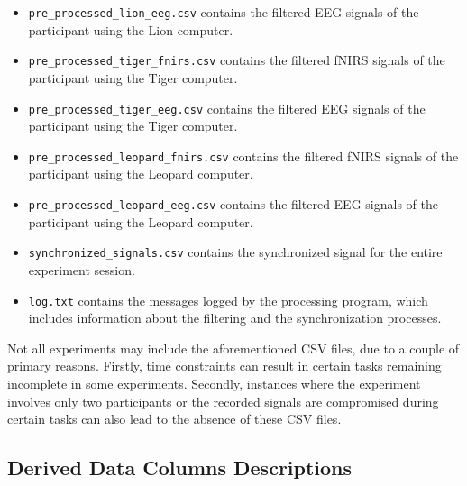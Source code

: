 \begin{itemize}
  \item \texttt{pre\_processed\_lion\_eeg.csv}  contains the filtered EEG signals of the participant using the Lion computer.
  \item \texttt{pre\_processed\_tiger\_fnirs.csv}  contains the filtered fNIRS signals of the participant using the Tiger computer.
  \item \texttt{pre\_processed\_tiger\_eeg.csv}  contains the filtered EEG signals of the participant using the Tiger computer.
  \item \texttt{pre\_processed\_leopard\_fnirs.csv}  contains the filtered fNIRS signals of the participant using the Leopard computer.
  \item \texttt{pre\_processed\_leopard\_eeg.csv}  contains the filtered EEG signals of the participant using the Leopard computer.
  \item \texttt{synchronized\_signals.csv} contains the synchronized signal for the entire experiment session.
  \item \texttt{log.txt} contains the messages logged by the processing program, which includes information about the filtering and the synchronization processes.
\end{itemize}

Not all experiments may include the aforementioned CSV files, due to a couple of primary reasons. Firstly, time constraints can result in certain tasks remaining incomplete in some experiments. Secondly, instances where the experiment involves only two participants or the recorded signals are compromised during certain tasks can also lead to the absence of these CSV files.

\subsection{Derived Data Columns Descriptions}
\label{sec:derived_data_cols_desc}


